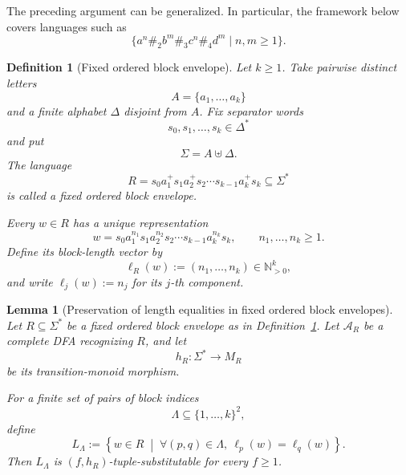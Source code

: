 \documentclass[11pt,a4paper]{article}
\newtheorem{lemma}[theorem]{Lemma}
\newtheorem{definition}[theorem]{Definition}
\theoremstyle{remark}
\begin{document}
The preceding argument can be generalized.  In particular, the framework below
covers languages such as
\[
  \{a^n\#_2b^m\#_3c^n\#_4d^m\mid n,m\ge1\}.
\]

\begin{definition}[Fixed ordered block envelope]
\label{def:fixed-ordered-block-envelope}
Let \(k\ge1\).  Take pairwise distinct letters
\[
  A=\{a_1,\ldots,a_k\}
\]
and a finite alphabet \(\Delta\) disjoint from \(A\).  Fix separator words
\[
  s_0,s_1,\ldots,s_k\in\Delta^*
\]
and put
\[
  \Sigma=A\uplus\Delta.
\]
The language
\[
  R
  =
  s_0a_1^+s_1a_2^+s_2\cdots s_{k-1}a_k^+s_k
  \subseteq\Sigma^*
\]
is called a \emph{fixed ordered block envelope}.

Every \(w\in R\) has a unique representation
\[
  w
  =
  s_0a_1^{n_1}s_1a_2^{n_2}s_2
  \cdots
  s_{k-1}a_k^{n_k}s_k,
  \qquad
  n_1,\ldots,n_k\ge1.
\]
Define its block-length vector by
\[
  \ell_R(w)
  :=
  (n_1,\ldots,n_k)
  \in\mathbb N_{>0}^k,
\]
and write \(\ell_j(w):=n_j\) for its \(j\)-th component.
\end{definition}

\begin{lemma}[Preservation of length equalities in fixed ordered block envelopes]
\label{lem:block-equality-envelopes}
Let \(R\subseteq\Sigma^*\) be a fixed ordered block envelope as in
Definition~\ref{def:fixed-ordered-block-envelope}.  Let \(\mathcal A_R\) be a
complete DFA recognizing \(R\), and let
\[
  h_R:\Sigma^*\longrightarrow M_R
\]
be its transition-monoid morphism.

For a finite set of pairs of block indices
\[
  \Lambda\subseteq\{1,\ldots,k\}^2,
\]
define
\[
  L_\Lambda
  :=
  \left\{
    w\in R
    \;\middle|\;
    \forall (p,q)\in\Lambda,\ 
    \ell_p(w)=\ell_q(w)
  \right\}.
\]
Then \(L_\Lambda\) is \((f,h_R)\)-tuple-substitutable for every \(f\ge1\).
\end{lemma}
\end{document}
